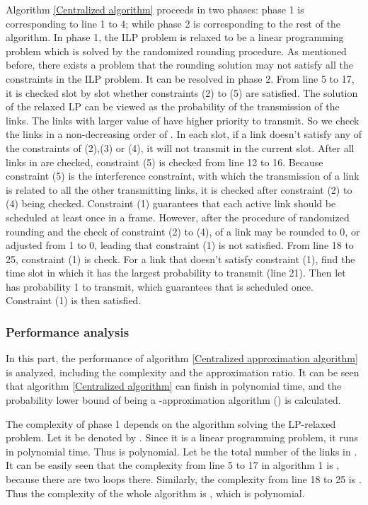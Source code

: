 \documentclass[conference]{IEEEtran}
\begin{document}
Algorithm \ref{Centralized algorithm} proceeds in two phases: phase
1 is corresponding to line 1 to 4; while phase 2 is corresponding to
the rest of the algorithm. In phase 1, the ILP problem is relaxed to
be a linear programming problem which is solved by the randomized
rounding procedure. As mentioned before, there exists a problem that
the rounding solution  may
not satisfy all the constraints in the ILP problem. It can be
resolved in phase 2. From line 5 to 17, it is checked slot by slot
whether constraints (2) to (5) are satisfied. The solution of the
relaxed LP  can be
viewed as the probability of the transmission of the links. The
links with larger value of  have higher priority to
transmit. So we check the links in a non-decreasing order of
. In each slot, if a link doesn't satisfy any of the
constraints of (2),(3) or (4), it will not transmit in the current
slot. After all links in  are checked, constraint (5)
is checked from line 12 to 16. Because constraint (5) is the
interference constraint, with which the transmission of a link is
related to all the other transmitting links, it is checked after
constraint (2) to (4) being checked. Constraint (1) guarantees that
each active link should be scheduled at least once in a frame.
However, after the procedure of randomized rounding and the check of
constraint (2) to (4),  of a link  may be rounded
to 0, or adjusted from 1 to 0, leading that constraint (1) is not
satisfied. From line 18 to 25, constraint (1) is check. For a link
 that doesn't satisfy constraint (1), find the time slot 
in which it has the largest probability to transmit (line 21). Then
let  has probability 1 to transmit, which guarantees that
 is scheduled once. Constraint (1) is then satisfied.
\subsubsection{Performance analysis}
In this part, the performance of algorithm \ref{Centralized
approximation algorithm} is analyzed, including the complexity and
the approximation ratio. It can be seen that algorithm
\ref{Centralized algorithm} can finish in polynomial time, and the
probability lower bound of being a -approximation
algorithm () is calculated.

The complexity of phase 1 depends on the algorithm solving the
LP-relaxed problem. Let it be denoted by . Since it is a
linear programming problem, it runs in polynomial time. Thus  is
polynomial. Let  be the total number of the links in . It can
be easily seen that the complexity from line 5 to 17 in algorithm 1
is , because there are two loops there. Similarly, the
complexity from line 18 to 25 is . Thus the complexity of
the whole algorithm is , which is polynomial.
\end{document}
